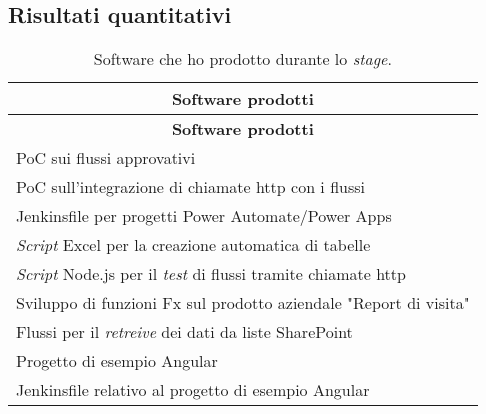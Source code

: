 \subsection{Risultati quantitativi}
\begingroup
\renewcommand\arraystretch{1.3}
\begin{longtable}{|p{11cm}|}
    \caption{Software che ho prodotto durante lo \emph{stage}.}
    \label{tab:risultatiQuantitativi}\\
    \hline \multicolumn{1}{|c|}{\textbf{Software prodotti}}\\ \hline \endfirsthead
    \hline \multicolumn{1}{|c|}{\textbf{Software prodotti}}\\ \hline \endhead
    \hline \endfoot
    \hline \endlastfoot
    \hline PoC sui flussi approvativi\\
    \hline PoC sull'integrazione di chiamate \gls{http} con i flussi\\
    \hline Jenkinsfile per progetti Power Automate/Power Apps\\
    \hline \emph{Script} Excel per la creazione automatica di tabelle\\
    \hline \emph{Script} Node.js per il \emph{test} di flussi tramite chiamate \gls{http}\\
    \hline Sviluppo di funzioni Fx sul prodotto aziendale "Report di visita"\\
    \hline Flussi per il \emph{retreive} dei dati da liste SharePoint\\
    \hline Progetto di esempio Angular\\
    \hline Jenkinsfile relativo al progetto di esempio Angular\\
\end{longtable}
\endgroup